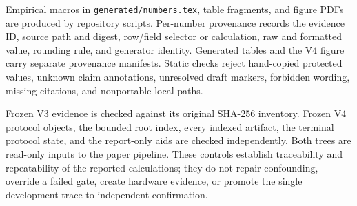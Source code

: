 Empirical macros in \texttt{generated/numbers.tex}, table fragments, and figure
PDFs are produced by repository scripts.  Per-number provenance records the
evidence ID, source path and digest, row/field selector or calculation, raw and
formatted value, rounding rule, and generator identity.  Generated tables and
the V4 figure carry separate provenance manifests.  Static checks reject
hand-copied protected values, unknown claim annotations, unresolved draft
markers, forbidden wording, missing citations, and nonportable local paths.

Frozen V3 evidence is checked against its original SHA-256 inventory.  Frozen
V4 protocol objects, the bounded root index, every indexed artifact, the
terminal protocol state, and the report-only aids are checked independently.
Both trees are read-only inputs to the paper pipeline.  These controls
establish traceability and repeatability of the reported calculations; they do
not repair confounding, override a failed gate, create hardware evidence, or
promote the single development trace to independent confirmation.
